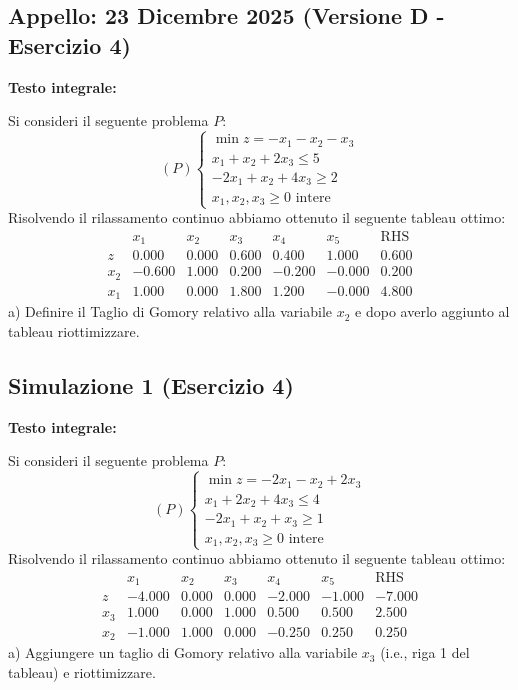 \documentclass[11pt, a4paper]{article}
\begin{document}
\bigskip

\subsection{Appello: 23 Dicembre 2025 (Versione D - Esercizio 4)}

\textbf{Testo integrale:}

Si consideri il seguente problema $P$:
\[
(P)
\begin{cases}
\min z = -x_1 - x_2 - x_3 \\
x_1 + x_2 + 2x_3 \le 5 \\
-2x_1 + x_2 + 4x_3 \ge 2 \\
x_1, x_2, x_3 \ge 0 \text{ intere}
\end{cases}
\]
Risolvendo il rilassamento continuo abbiamo ottenuto il seguente tableau ottimo:
\[
\begin{array}{c|ccccc|c}
   & x_1 & x_2 & x_3 & x_4 & x_5 & \text{RHS} \\
\hline
z  & 0.000 & 0.000 & 0.600 & 0.400 & 1.000 & 0.600 \\
\hline
x_2 & -0.600 & 1.000 & 0.200 & -0.200 & -0.000 & 0.200 \\
x_1 & 1.000 & 0.000 & 1.800 & 1.200 & -0.000 & 4.800
\end{array}
\]
a) Definire il Taglio di Gomory relativo alla variabile $x_2$ e dopo averlo aggiunto al tableau riottimizzare.

\bigskip

\subsection{Simulazione 1 (Esercizio 4)}

\textbf{Testo integrale:}

Si consideri il seguente problema $P$:
\[
(P)
\begin{cases}
\min z = -2x_1 - x_2 + 2x_3 \\
x_1 + 2x_2 + 4x_3 \le 4 \\
-2x_1 + x_2 + x_3 \ge 1 \\
x_1, x_2, x_3 \ge 0 \text{ intere}
\end{cases}
\]
Risolvendo il rilassamento continuo abbiamo ottenuto il seguente tableau ottimo:
\[
\begin{array}{c|ccccc|c}
   & x_1 & x_2 & x_3 & x_4 & x_5 & \text{RHS} \\
\hline
z  & -4.000 & 0.000 & 0.000 & -2.000 & -1.000 & -7.000 \\
\hline
x_3 & 1.000 & 0.000 & 1.000 & 0.500 & 0.500 & 2.500 \\
x_2 & -1.000 & 1.000 & 0.000 & -0.250 & 0.250 & 0.250
\end{array}
\]
a) Aggiungere un taglio di Gomory relativo alla variabile $x_3$ (i.e., riga 1 del tableau) e riottimizzare.
\end{document}
